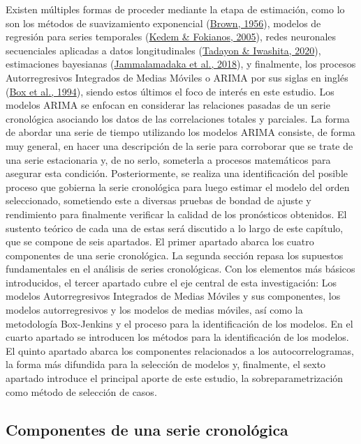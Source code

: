 \documentclass[
]{article}
\begin{document}
Existen múltiples formas de proceder mediante la etapa de estimación,
como lo son los métodos de suavizamiento exponencial
(\protect\hyperlink{ref-brown}{Brown, 1956}), modelos de regresión para
series temporales (\protect\hyperlink{ref-kedem}{Kedem \& Fokianos,
2005}), redes neuronales secuenciales aplicadas a datos longitudinales
(\protect\hyperlink{ref-redes}{Tadayon \& Iwashita, 2020}), estimaciones
bayesianas (\protect\hyperlink{ref-bayes}{Jammalamadaka et al., 2018}),
y finalmente, los procesos Autorregresivos Integrados de Medias Móviles
o ARIMA por sus siglas en inglés
(\protect\hyperlink{ref-box-jenkins}{Box et al., 1994}), siendo estos
últimos el foco de interés en este estudio. Los modelos ARIMA se enfocan
en considerar las relaciones pasadas de un serie cronológica asociando
los datos de las correlaciones totales y parciales. La forma de abordar
una serie de tiempo utilizando los modelos ARIMA consiste, de forma muy
general, en hacer una descripción de la serie para corroborar que se
trate de una serie estacionaria y, de no serlo, someterla a procesos
matemáticos para asegurar esta condición. Posteriormente, se realiza una
identificación del posible proceso que gobierna la serie cronológica
para luego estimar el modelo del orden seleccionado, sometiendo este a
diversas pruebas de bondad de ajuste y rendimiento para finalmente
verificar la calidad de los pronósticos obtenidos. El sustento teórico
de cada una de estas será discutido a lo largo de este capítulo, que se
compone de seis apartados. El primer apartado abarca los cuatro
componentes de una serie cronológica. La segunda sección repasa los
supuestos fundamentales en el análisis de series cronológicas. Con los
elementos más básicos introducidos, el tercer apartado cubre el eje
central de esta investigación: Los modelos Autorregresivos Integrados de
Medias Móviles y sus componentes, los modelos autorregresivos y los
modelos de medias móviles, así como la metodología Box-Jenkins y el
proceso para la identificación de los modelos. En el cuarto apartado se
introducen los métodos para la identificación de los modelos. El quinto
apartado abarca los componentes relacionados a los autocorrelogramas, la
forma más difundida para la selección de modelos y, finalmente, el sexto
apartado introduce el principal aporte de este estudio, la
sobreparametrización como método de selección de casos.

\subsection{Componentes de una serie cronológica}
\end{document}
